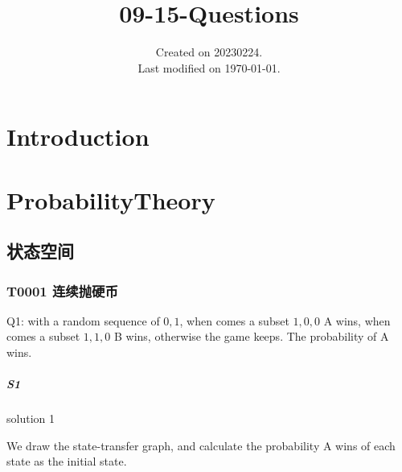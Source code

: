 \documentclass[UTF8]{../09-Mathematics}
\begin{document}
\title{09-15-Questions}
\date{Created on 20230224.\\   Last modified on \today.}
\maketitle
\tableofcontents


\chapter{Introduction}






\chapter{ProbabilityTheory}

\section{状态空间}
\subsection{T0001 连续抛硬币}

Q1: with a random sequence of ${0, 1}$, when comes a subset ${1,0,0}$ A wins, when comes a subset ${1,1,0}$ B wins, otherwise the game keeps. The probability of A wins.


\paragraph{S1} solution 1

We draw the state-transfer graph, and calculate the probability A wins of each state as the initial state.
\end{document}
